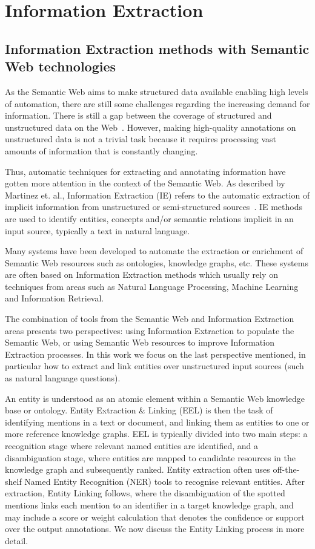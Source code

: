 \section{Information Extraction}
\label{cap2:theoFrame/infExtr}
\subsection{Information Extraction methods with Semantic Web technologies}
\label{cap2:theoFrame/infExtr/methods}
As the Semantic Web aims to make structured data available enabling high levels of 
automation, there are still some challenges regarding the increasing demand for information. 
There is still a gap between the coverage of structured and unstructured data on the 
Web~\cite{infExtr:PolleresHHD10}. However, making high-quality annotations on unstructured 
data is not a trivial task because it requires processing vast amounts of information that 
is constantly changing. 

Thus, automatic techniques for extracting and annotating information have gotten more 
attention in the context of the Semantic Web. As described by Martinez et. al., Information 
Extraction (IE) refers to the automatic extraction of implicit information from unstructured 
or semi-structured sources~\cite{infExtr:MartinezHL19}. IE methods are used to identify 
entities, concepts and/or semantic relations implicit in an input source, typically a text 
in natural language. 

Many systems have been developed to automate the extraction or enrichment of Semantic Web 
resources such as ontologies, knowledge graphs, etc. These systems are often based on 
Information Extraction methods which usually rely on techniques from areas such as Natural 
Language Processing, Machine Learning and Information Retrieval. 

The combination of tools from the Semantic Web and Information Extraction areas presents two 
perspectives: using Information Extraction to populate the Semantic Web, or using Semantic 
Web resources to improve Information Extraction processes. In this work we focus on the last 
perspective mentioned, in particular how to extract and link entities over unstructured input 
sources (such as natural language questions).

An entity is understood as an atomic element within a Semantic Web knowledge base or ontology. 
Entity Extraction \& Linking (EEL) is then the task of identifying mentions in a text or 
document, and linking them as entities to one or more reference knowledge graphs. EEL is 
typically divided into two main steps: a recognition stage where relevant named entities are 
identified, and a disambiguation stage, where entities are mapped to candidate resources in 
the knowledge graph and subsequently ranked. Entity extraction often uses off-the-shelf Named 
Entity Recognition (NER) tools to recognise relevant entities. After extraction, Entity 
Linking follows, where the disambiguation of the spotted mentions links each mention to an 
identifier in a target knowledge graph, and may include a score or weight calculation that 
denotes the confidence or support over the output annotations. We now discuss the Entity 
Linking process in more detail.

